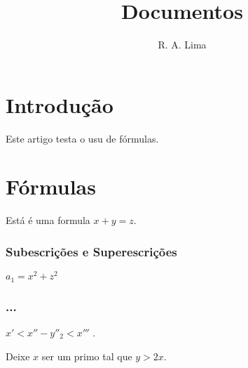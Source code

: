 \documentclass[twocolumns,12pt]{report}
\title{Documentos}
\author{R. A. Lima}
\begin{document}
	\maketitle

	\section{Introdução}
		Este artigo testa o usu de fórmulas.
	\section{Fórmulas}
		Está é uma formula \( x + y = z \).
	\subsubsection{Subescrições e Superescrições}
		\(a_1 = x^2 + z^2 \)
	\subsubsection{...}
		\( x' < x'' - y''_{2} < x''' \) .

		Deixe $x$ ser um primo tal que $y > 2x$.
\end{document}

